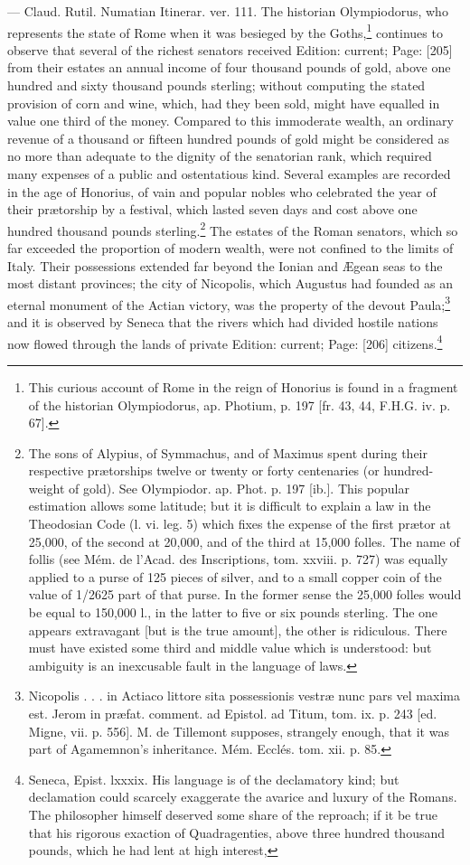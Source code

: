 {\texthebrew{—} Claud. Rutil. Numatian Itinerar. ver. 111.} The historian Olympiodorus, who represents the state of Rome when it was besieged by the Goths,\footnote{This curious account of Rome in the reign of Honorius is found in a fragment of the historian Olympiodorus, ap. Photium, p. 197 [fr. 43, 44, F.H.G. iv. p. 67].} continues to observe that several of the richest senators received Edition: current; Page: [205] from their estates an annual income of four thousand pounds of gold, above one hundred and sixty thousand pounds sterling; without computing the stated provision of corn and wine, which, had they been sold, might have equalled in value one third of the money. Compared to this immoderate wealth, an ordinary revenue of a thousand or fifteen hundred pounds of gold might be considered as no more than adequate to the dignity of the senatorian rank, which required many expenses of a public and ostentatious kind. Several examples are recorded in the age of Honorius, of vain and popular nobles who celebrated the year of their prætorship by a festival, which lasted seven days and cost above one hundred thousand pounds sterling.\footnote{The sons of Alypius, of Symmachus, and of Maximus spent during their respective prætorships twelve or twenty or forty centenaries (or hundred-weight of gold). See Olympiodor. ap. Phot. p. 197 [ib.]. This popular estimation allows some latitude; but it is difficult to explain a law in the Theodosian Code (l. vi. leg. 5) which fixes the expense of the first prætor at 25,000, of the second at 20,000, and of the third at 15,000 folles. The name of follis (see Mém. de l\texthebrew{}’Acad. des Inscriptions, tom. xxviii. p. 727) was equally applied to a purse of 125 pieces of silver, and to a small copper coin of the value of 1/2625 part of that purse. In the former sense the 25,000 folles would be equal to 150,000 l., in the latter to five or six pounds sterling. The one appears extravagant [but is the true amount], the other is ridiculous. There must have existed some third and middle value which is understood: but ambiguity is an inexcusable fault in the language of laws.} The estates of the Roman senators, which so far exceeded the proportion of modern wealth, were not confined to the limits of Italy. Their possessions extended far beyond the Ionian and Ægean seas to the most distant provinces; the city of Nicopolis, which Augustus had founded as an eternal monument of the Actian victory, was the property of the devout Paula;\footnote{Nicopolis . . . in Actiaco littore sita possessionis vestræ nunc pars vel maxima est. Jerom in præfat. comment. ad Epistol. ad Titum, tom. ix. p. 243 [ed. Migne, vii. p. 556]. M. de Tillemont supposes, strangely enough, that it was part of Agamemnon\texthebrew{}’s inheritance. Mém. Ecclés. tom. xii. p. 85.} and it is observed by Seneca that the rivers which had divided hostile nations now flowed through the lands of private Edition: current; Page: [206] citizens.\footnote{Seneca, Epist. lxxxix. His language is of the declamatory kind; but declamation could scarcely exaggerate the avarice and luxury of the Romans. The philosopher himself deserved some share of the reproach; if it be true that his rigorous exaction of Quadragenties, above three hundred thousand pounds, which he had lent at high interest, }
